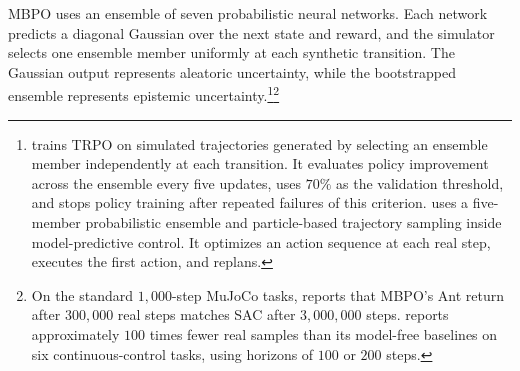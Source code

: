 MBPO uses an ensemble of seven probabilistic neural networks. Each network predicts a diagonal Gaussian over the next state and reward, and the simulator selects one ensemble member uniformly at each synthetic transition. The Gaussian output represents aleatoric uncertainty, while the bootstrapped ensemble represents epistemic uncertainty.\footnote{\citet{Kurutach2018} trains TRPO on simulated trajectories generated by selecting an ensemble member independently at each transition. It evaluates policy improvement across the ensemble every five updates, uses $70\%$ as the validation threshold, and stops policy training after repeated failures of this criterion. \citet{Chua2018PETS} uses a five-member probabilistic ensemble and particle-based trajectory sampling inside model-predictive control. It optimizes an action sequence at each real step, executes the first action, and replans.}\footnote{On the standard $1{,}000$-step MuJoCo tasks, \citet{janner2019model} reports that MBPO's Ant return after $300{,}000$ real steps matches SAC after $3{,}000{,}000$ steps. \citet{Kurutach2018} reports approximately $100$ times fewer real samples than its model-free baselines on six continuous-control tasks, using horizons of $100$ or $200$ steps.}
